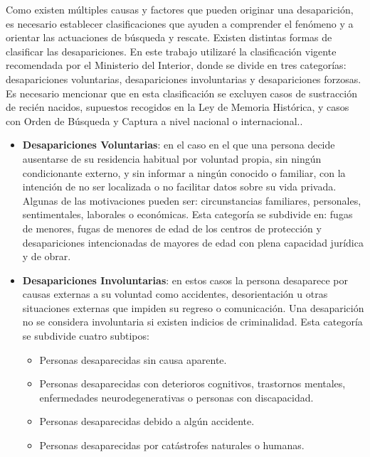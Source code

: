     Como existen múltiples causas y factores que pueden originar una desaparición, es necesario establecer clasificaciones que ayuden a comprender el fenómeno y a orientar las actuaciones de búsqueda y rescate. Existen distintas formas de clasificar las desapariciones. En este trabajo utilizaré la clasificación vigente recomendada por el Ministerio del Interior, donde se divide en tres categorías: desapariciones voluntarias, desapariciones involuntarias y desapariciones forzosas. Es necesario mencionar que en esta clasificación se excluyen casos de sustracción de recién nacidos, supuestos recogidos en la Ley de Memoria Histórica, y casos con Orden de Búsqueda y Captura a nivel nacional o internacional.\cite{CNDES,FolletoInfo_personasDes,cndesprotocoloFFCC,SOSDesaparecidosActuar}. 
        \begin{itemize}
            \item \textbf{Desapariciones Voluntarias}: en el caso en el que una persona decide ausentarse de su residencia habitual por voluntad propia, sin ningún condicionante externo, y sin informar a ningún conocido o familiar, con la intención de no ser localizada o no facilitar datos sobre su vida privada. Algunas de las motivaciones pueden ser: circunstancias familiares, personales, sentimentales, laborales o económicas. Esta categoría se subdivide en: fugas de menores, fugas de menores de edad de los centros de protección y desapariciones intencionadas de mayores de edad con plena capacidad jurídica y de obrar.

            \item \textbf{Desapariciones Involuntarias}: en estos casos la persona desaparece por causas externas a su voluntad como accidentes, desorientación u otras situaciones externas que impiden su regreso o comunicación. Una desaparición no se considera involuntaria si existen indicios de criminalidad. Esta categoría se subdivide cuatro subtipos:
                \begin{itemize}
                    \item Personas desaparecidas sin causa aparente.
                    \item Personas desaparecidas con deterioros cognitivos, trastornos mentales, enfermedades neurodegenerativas o personas con discapacidad.
                    \item Personas desaparecidas debido a algún accidente.
                    \item Personas desaparecidas por catástrofes naturales o humanas.
                \end{itemize}


\end{itemize}
